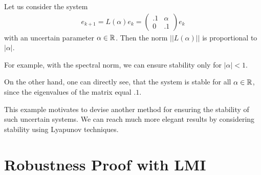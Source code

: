 \begin{exam}
	\label{exp:rob:bad_example}
Let us consider the system 
\begin{align}
e_{k+1}  = L(\alpha) e_k = \begin{pmatrix}
.1 & \alpha \\ 0 & .1
\end{pmatrix}e_k
\end{align}
with an  uncertain parameter $\alpha \in {\mathbb{R}}$.
Then the norm $||L(\alpha)||$ is proportional to $|\alpha|$.

For example, with the spectral norm, we can ensure stability only for $|\alpha|<1$. 


On the other hand, one can directly see, that the system is stable for all $\alpha \in {\mathbb{R}}$, since the eigenvalues of the matrix equal $.1$. 	
\end{exam}

This example motivates to devise another method for ensuring the stability of  such uncertain systems. 
We can reach much more elegant results by considering stability using Lyapunov techniques. 

 

\section{Robustness Proof with LMI}

